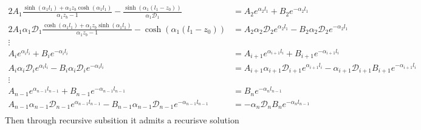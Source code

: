 \documentclass{article}
\newcommand{\diffusion}{\mathcal{D}}
\begin{document}
\begin{align*}
    2 A_1 \frac{ \sinh \left(\alpha_1 l_1\right)+\alpha_1 z_b \cosh \left(\alpha_1 l_1\right)}{\alpha_1 z_b-1}
    -\frac{\sinh \left(\alpha_1 (l_1-z_0)\right)}{\alpha_1 \diffusion_1} &=
    A_2 e^{\alpha_2 l_1} + B_2 e^{-\alpha_2 l_1} \\
    2 A_1 \alpha_1 \diffusion_1 \frac{\cosh \left(\alpha_1 l_1\right)+\alpha _1 z_b \sinh \left(\alpha _1 l_1\right)}{\alpha _1 z_b-1}
    - \cosh(\alpha_1(l_1-z_0)) &=
    A_2 \alpha_2 \diffusion_2 e^{\alpha_2 l_1} - B_2 \alpha_2 \diffusion_2 e^{-\alpha_2 l_1} \\
    \vdots \\
    A_i e^{\alpha_i l_i} + B_i e^{-\alpha_i l_i} &= A_{i+1} e^{\alpha_{i+1} l_i} + B_{i+1} e^{-\alpha_{i+1} l_i} \\
    A_i \alpha_i \diffusion_i e^{\alpha_i l_i} - B_i \alpha_i \diffusion_i e^{-\alpha_i l_i} &= A_{i+1} \alpha_{i+1} \diffusion_{i+1} e^{\alpha_{i+1} l_i} - \alpha_{i+1} \diffusion_{i+1} B_{i+1} e^{-\alpha_{i+1} l_i} \\
    \vdots \\
    A_{n-1} e^{\alpha_{n-1} l_{n-1}} + B_{n-1} e^{-\alpha_{n-1} l_{n-1}} &= B_n e^{-\alpha_n l_{n-1}} \\
    A_{n-1} \alpha_{n-1} \diffusion_{n-1} e^{\alpha_{n-1} l_{n-1}} - B_{n-1} \alpha_{n-1} \diffusion_{n-1} e^{-\alpha_{n-1} l_{n-1}} &= - \alpha_n \diffusion_n B_n e^{-\alpha_n l_{n-1}} \\
\end{align*}
Then through recursive subsition it admits a recurisve solution
\end{document}
